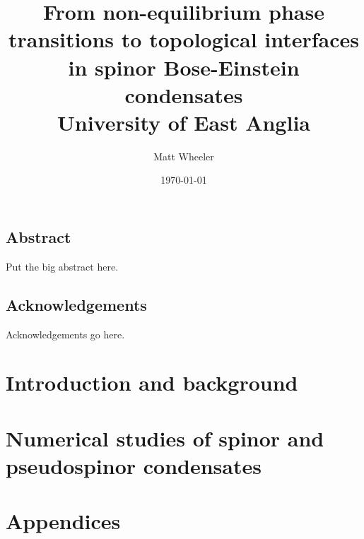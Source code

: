 \documentclass[a4paper, oneside, 11pt]{memoir}
\title{From non-equilibrium phase transitions to topological interfaces in
spinor Bose-Einstein condensates\\
{\Large University of East Anglia}}
\author{Matt Wheeler}
\date{\today}
\begin{document}
\maketitle
\thispagestyle{empty}

\frontmatter
\chapter*{Abstract}
Put the big abstract here.

\newpage
\chapter*{Acknowledgements}
Acknowledgements go here.

\newpage
\tableofcontents

\newpage
\listoffigures

\clearpage


\mainmatter{}
\part{Introduction and background}




\part{Numerical studies of spinor and pseudospinor condensates}





\part{Appendices}
\appendix


\backmatter{}
\printbibliography{}
\end{document}
